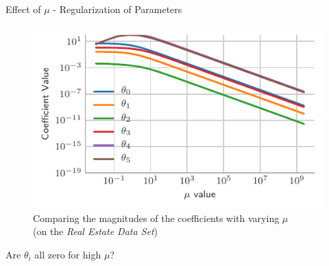 \documentclass{beamer}
\begin{document}

\begin{frame}{Effect of $\mu$ - Regularization of Parameters}
\vspace{0.4cm}
\begin{figure}\includegraphics[width=0.8\linewidth]{../assets/ridge-regression/figures/rid_reg-without-lim.pdf}\caption{Comparing the magnitudes of the coefficients with varying $\mu$\\(on the \emph{Real Estate Data Set})}
\end{figure}
\pause Are $\theta_{i}$ all zero for high $\mu$?
\end{frame}
\end{document}
